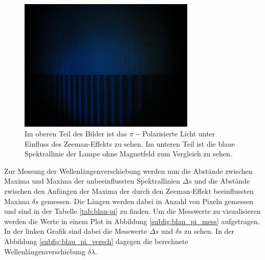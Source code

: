 \begin{figure}
    \centering
    \includegraphics[width=0.75\textwidth]{content/data/Blau_0_pi_uebernander.JPG}
    \caption{Im oberen Teil des Bilder ist das $\pi -$Polarisierte Licht unter Einfluss des Zeeman-Effekts zu sehen. Im unteren Teil ist die blaue Spektrallinie der Lampe ohne Magnetfeld zum Vergleich zu sehen.}
    \label{fig:pi-blau}
\end{figure}

Zur Messung der Wellenlängenverschiebung werden nun die Abstände zwischen Maxima und Maxima der unbeeinflussten Spektrallinien $\Delta s$
und die Abstände zwischen den Anfängen der Maxima der durch den Zeeman-Effekt beeinflussten Maxima $\delta s$ gemessen.
Die Längen werden dabei in Anzahl von Pixeln gemessen und sind in der Tabelle \ref{tab:blau-pi} zu finden.
Um die Messwerte zu visualisieren werden die Werte in einem Plot in Abbildung \ref{subfig:blau_pi_mess} aufgetragen.
In der linken Grafik sind dabei die Messwerte $\Delta s$ und $\delta s$ zu sehen.
In der Abbildung \autoref{subfig:blau_pi_versch} dagegen die berechnete Wellenlängenverschiebung $\delta \lambda$.

